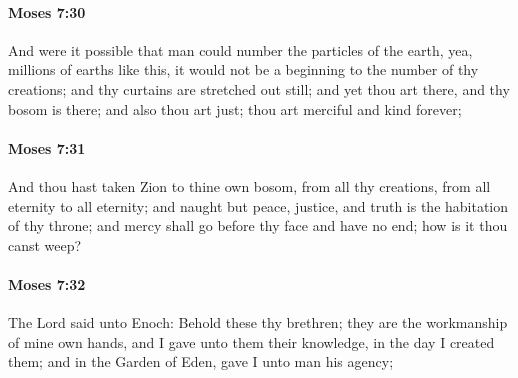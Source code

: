 		\paragraph{Moses 7:30} %
			\label{MOSES-7-30}

			And were it possible that man could number the particles of the earth, yea, millions of earths like this, it would not be a beginning to the number of thy creations; and thy curtains are stretched out still; and yet thou art there, and thy bosom is there; and also thou art just; thou art merciful and kind forever;


		\paragraph{Moses 7:31} %
			\label{MOSES-7-31}

			And thou hast taken Zion to thine own bosom, from all thy creations, from all eternity to all eternity; and naught but peace, justice, and truth is the habitation of thy throne; and mercy shall go before thy face and have no end; how is it thou canst weep?


		\paragraph{Moses 7:32} %
			\label{MOSES-7-32}

			The Lord said unto Enoch: Behold these thy brethren; they are the workmanship of mine own hands, and I gave unto them their knowledge, in the day I created them; and in the Garden of Eden, gave I unto man his agency;

